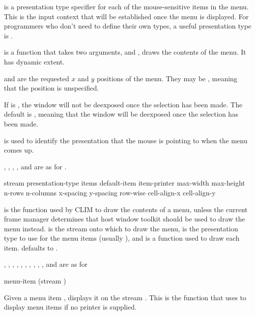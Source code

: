  is a presentation type specifier for each of the mouse-sensitive
items in the menu.  This is the input context that will be established once the
menu is displayed.  For programmers who don't need to define their own types, a
useful presentation type is .

 is a function that takes two arguments,  and
, draws the contents of the menu.  It has dynamic extent.

 and  are the requested $x$ and $y$ positions of
the menu.  They may be , meaning that the position is unspecified.

If  is , the window will not be deexposed
once the selection has been made. The default is , meaning that the
window will be deexposed once the selection has been made.

 is used to identify the presentation that the mouse
is pointing to when the menu comes up.

, , , , and
 are as for .

 {stream presentation-type items default-item
                             \key item-printer
                                  max-width max-height n-rows n-columns
                                  x-spacing y-spacing row-wise
                                  cell-align-x cell-align-y}

 is the function used by CLIM to draw the contents of a
menu, unless the current frame manager determines that host window toolkit
should be used to draw the menu instead.   is the stream onto which
to draw the menu,  is the presentation type to use for
the menu items (usually ), and  is a function
used to draw each item.   defaults to .

, , , ,
, , , , ,
, and  are as for 

 {menu-item \optional (stream )}

Given a menu item , displays it on the stream . This
is the function that  uses to display menu items if no printer
is supplied.



